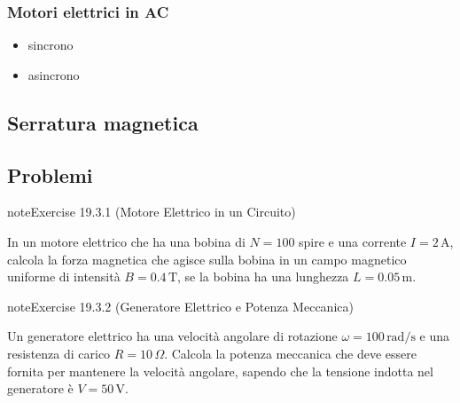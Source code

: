 \documentclass[letterpaper,10pt,italian]{jupyterBook}
\begin{document}
\subsubsection{Motori elettrici in AC}
\label{\detokenize{ch/electromagnetism/electric-machines:motori-elettrici-in-ac}}\begin{itemize}
\item {} 
\sphinxAtStartPar
sincrono

\item {} 
\sphinxAtStartPar
asincrono

\end{itemize}


\subsection{Serratura magnetica}
\label{\detokenize{ch/electromagnetism/electric-machines:serratura-magnetica}}
\sphinxstepscope


\subsection{Problemi}
\label{\detokenize{ch/electromagnetism/electric-machines-problems:problemi}}\label{\detokenize{ch/electromagnetism/electric-machines-problems:physics-hs-electromagnetism-electric-machines-problems}}\label{\detokenize{ch/electromagnetism/electric-machines-problems::doc}} \label{exercise:ch/electromagnetism/electric-machines-problems-exercise-0}

\begin{sphinxadmonition}{note}{Exercise 19.3.1 (Motore Elettrico in un Circuito)}



\sphinxAtStartPar
In un motore elettrico che ha una bobina di \(N = 100\) spire e una corrente \(I = 2 \, \text{A}\), calcola la forza magnetica che agisce sulla bobina in un campo magnetico uniforme di intensità \(B = 0.4 \, \text{T}\), se la bobina ha una lunghezza \(L = 0.05 \, \text{m}\).
\end{sphinxadmonition}
 \label{exercise:ch/electromagnetism/electric-machines-problems-exercise-1}

\begin{sphinxadmonition}{note}{Exercise 19.3.2 (Generatore Elettrico e Potenza Meccanica)}



\sphinxAtStartPar
Un generatore elettrico ha una velocità angolare di rotazione \(\omega = 100 \, \text{rad/s}\) e una resistenza di carico \(R = 10 \, \Omega\). Calcola la potenza meccanica che deve essere fornita per mantenere la velocità angolare, sapendo che la tensione indotta nel generatore è \(V = 50 \, \text{V}\).
\end{sphinxadmonition}
 \label{exercise:ch/electromagnetism/electric-machines-problems-exercise-2}
\end{document}
